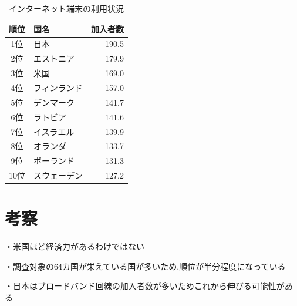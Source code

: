 \documentclass[a4paper,11pt,dvipdfmx]{ujarticle}
\begin{document}
\begin{table}[htbp]
    \centering
    \caption{インターネット端末の利用状況}
    \label{tbl:利用状況}

    \begin{tabular}{|c|l|r|}\hline
        順位 & 国名 & 加入者数\\
        \hline
        1位 & 日本   & 190.5 \\
        \hline
        2位 & エストニア  & 179.9 \\
        \hline
        3位 & 米国  & 169.0 \\
        \hline
        4位 & フィンランド  & 157.0 \\
        \hline
        5位 & デンマーク  & 141.7 \\
        \hline
        6位 & ラトビア  & 141.6 \\
        \hline 
        7位 & イスラエル  & 139.9 \\
        \hline
        8位 & オランダ  & 133.7 \\
        \hline
        9位 & ポーランド  & 131.3 \\
        \hline
        10位 & スウェーデン  & 127.2 \\
        \hline

    \end{tabular}
\end{table}
\section{考察}
・米国ほど経済力があるわけではない

・調査対象の64カ国が栄えている国が多いため,順位が半分程度になっている

・日本はブロードバンド回線の加入者数が多いためこれから伸びる可能性がある











\end{document}
